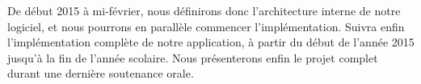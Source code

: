 		De début 2015 à mi-février, nous définirons donc l'architecture interne de notre logiciel, et nous pourrons en parallèle commencer l'implémentation.
		Suivra enfin l'implémentation complète de notre application, à partir du début de l'année 2015 jusqu'à la fin de l'année scolaire.
		Nous présenterons enfin le projet complet durant une dernière soutenance orale.

	    
